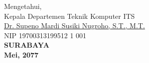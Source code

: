 \vspace{\fill}

\begin{center}
  Mengetahui,\\
  Kepala Departemen Teknik Komputer ITS\\
  \vspace{10ex}
  \underline{Dr. Supeno Mardi Susiki Nugroho, S.T., M.T.}\\
  NIP 19700313199512 1 001\\
  \vspace{10ex}
  \textbf{SURABAYA} \\
  \textbf{Mei, 2077}
\end{center}
\endgroup
